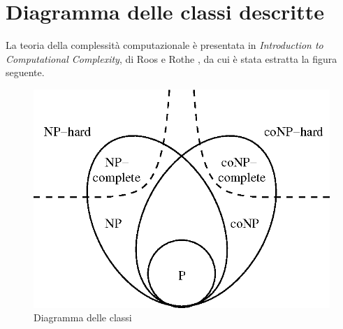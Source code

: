 \section{Diagramma delle classi descritte}
La teoria della complessità computazionale è presentata in \emph{Introduction to Computational Complexity}, di Roos e Rothe \cite{Roos2010IntroductionTC}, da cui è stata estratta la figura seguente.
\begin{figure}[H]
    \centering
    \includegraphics[width=0.9\columnwidth]{./figures/complexity_diagram.png}
    \caption{Diagramma delle classi}
    \label{fig:diagrampnpconp}
\end{figure}
